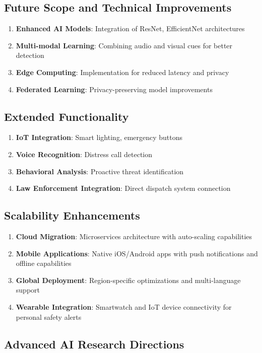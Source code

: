 \documentclass[12pt,a4paper]{article}
\begin{document}
\subsection{Future Scope and Technical Improvements}
\begin{enumerate}
    \item \textbf{Enhanced AI Models}: Integration of ResNet, EfficientNet architectures
    \item \textbf{Multi-modal Learning}: Combining audio and visual cues for better detection
    \item \textbf{Edge Computing}: Implementation for reduced latency and privacy
    \item \textbf{Federated Learning}: Privacy-preserving model improvements
\end{enumerate}

\subsection{Extended Functionality}
\begin{enumerate}
    \item \textbf{IoT Integration}: Smart lighting, emergency buttons
    \item \textbf{Voice Recognition}: Distress call detection
    \item \textbf{Behavioral Analysis}: Proactive threat identification
    \item \textbf{Law Enforcement Integration}: Direct dispatch system connection
\end{enumerate}

\subsection{Scalability Enhancements}
\begin{enumerate}
    \item \textbf{Cloud Migration}: Microservices architecture with auto-scaling capabilities
    \item \textbf{Mobile Applications}: Native iOS/Android apps with push notifications and offline capabilities
    \item \textbf{Global Deployment}: Region-specific optimizations and multi-language support
    \item \textbf{Wearable Integration}: Smartwatch and IoT device connectivity for personal safety alerts
\end{enumerate}

\subsection{Advanced AI Research Directions}
\end{document}
